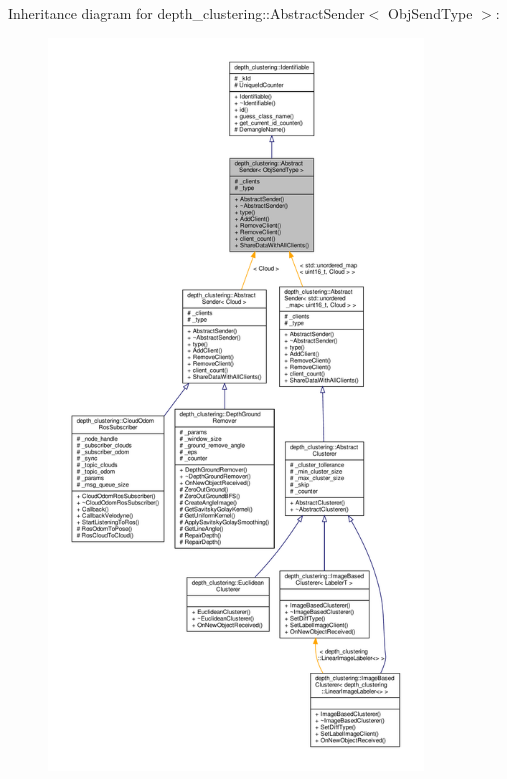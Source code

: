 Inheritance diagram for depth\+\_\+clustering\+:\+:Abstract\+Sender$<$ Obj\+Send\+Type $>$\+:\nopagebreak
\begin{figure}[H]
\begin{center}
\leavevmode
\includegraphics[height=550pt]{classdepth__clustering_1_1AbstractSender__inherit__graph}
\end{center}
\end{figure}


